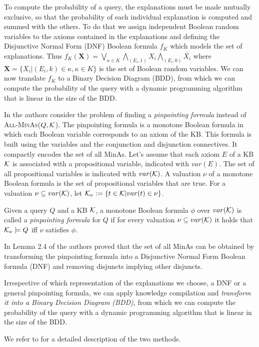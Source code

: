 To compute the probability of a query, the explanations must be made mutually exclusive, so
that the probability of each individual explanation is computed and summed
with the others. To do that we assign independent Boolean random variables to the axioms contained in the explanations and defining 
the Disjunctive Normal Form (DNF) Boolean formula $f_K$ which models the set of explanations. Thus
$
f_K(\mathbf{X})=\bigvee_{\kappa\in K}\bigwedge_{(E_i,1)}X_{i}\bigwedge_{(E_i,0)}\overline{X_{i}}
$
where $\mathbf{X}=\{X_{i}|(E_i,k)\in\kappa,\kappa\in K\}$ is the set of Boolean random variables.
We can now translate $f_K$ to a Binary Decision Diagram (BDD), from which we can compute the probability of the query with a dynamic programming algorithm that is linear in the size of the BDD.


In \cite{DBLP:journals/jar/BaaderP10,DBLP:journals/logcom/BaaderP10} the authors consider the problem of finding a \emph{pinpointing formula} instead of 
 \textsc{All-MinAs($Q,{\cal K}$)}.
 The pinpointing formula is a monotone Boolean formula in which each Boolean variable corresponds to an axiom of the KB. This formula is built using 
 the variables and the conjunction and disjunction connectives. It compactly encodes the set of all MinAs.
 Let's assume that each axiom $E$ of a KB ${\cal K}$ is associated with a propositional variable, indicated with $var(E)$. The set of all propositional variables is indicated with $var({\cal K} )$.
 A valuation $\nu$ of a monotone Boolean formula is the set of propositional variables that are true. For a valuation $\nu \subseteq var({\cal K})$, let ${\cal K}_{\nu} := \{t \in {\cal K} |var(t)\in\nu\}$.
 \begin{definition}
 Given a query $Q$ and a KB ${\cal K}$, a monotone Boolean formula $\phi$ over $var({\cal K})$ is called a \emph{pinpointing formula} for $Q$ if for every valuation $\nu \subseteq var({\cal K})$ it holds that ${\cal K}_{\nu} \models Q$ iff
 $\nu$ satisfies $\phi$.
  
 \end{definition}
 In Lemma 2.4 of \cite{DBLP:journals/logcom/BaaderP10} the authors proved that the set of all MinAs can be obtained by transforming the pinpointing formula into a Disjunctive Normal Form Boolean formula (DNF) and removing disjuncts implying other disjuncts. 

Irrespective of which representation of the explanations we choose, a DNF or a general pinpointing formula, we can apply knowledge compilation and \textit{transform it into a Binary Decision Diagram (BDD)}, 
 from which we can compute the probability of the query with a dynamic programming algorithm that is linear in the size of the BDD.
 
We refer to \cite{Zese17-SSW-BK,ZesBelRig16-AMAI-IJ} for a detailed description of the two methods.